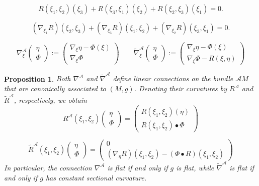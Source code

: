 \documentclass[10pt,a4paper]{amsart}
\newtheorem{prop}{Proposition}
\def\Cal{\mathcal}
\newcommand{\tn}{\widetilde{\nabla}}
\begin{document}
\begin{equation}\label{Bianchi1}
R(\xi_1,\xi_2)(\xi_3)+R(\xi_3,\xi_1)(\xi_2)+R(\xi_2,\xi_3)(\xi_1)=0. 
\end{equation}

\begin{equation}\label{Bianchi2}
(\nabla_{\xi_1}R)(\xi_2,\xi_3)+(\nabla_{\xi_3}R)(\xi_1,\xi_2)+(\nabla_{\xi_2}R)(\xi_3,\xi_1)=0.
\end{equation}

\begin{equation}\label{conn-def}
\nabla^{\Cal A}_\xi\begin{pmatrix} \eta\\ \Phi \end{pmatrix}:=\begin{pmatrix}
\nabla_\xi\eta-\Phi(\xi)\\ \nabla_\xi\Phi \end{pmatrix} \qquad 
\tn^{\Cal A}_\xi\begin{pmatrix} \eta\\ \Phi \end{pmatrix}:=\begin{pmatrix}
\nabla_\xi\eta-\Phi(\xi)\\ \nabla_\xi\Phi-R(\xi,\eta) \end{pmatrix}
\end{equation}

\begin{prop}\label{prop2.2}
Both $\nabla^{\Cal A}$ and $\tn^{\Cal A}$ define linear connections on the bundle
$\Cal AM$ that are canonically associated to $(M,g)$. Denoting their curvatures by
$R^{\Cal A}$ and $\widetilde{R}^{\Cal A}$, respectively, we obtain
$$
R^{\Cal A}(\xi_1,\xi_2)\begin{pmatrix} \eta\\ \Phi \end{pmatrix}=\begin{pmatrix}
R(\xi_1,\xi_2)(\eta) \\ R(\xi_1,\xi_2)\bullet \Phi \end{pmatrix}
$$

$$ \widetilde{R}^{\Cal A}(\xi_1,\xi_2)\begin{pmatrix}
  \eta\\ \Phi \end{pmatrix}=\begin{pmatrix} 0 \\ (\nabla_\eta
R)(\xi_1,\xi_2)-(\Phi\bullet R)(\xi_1,\xi_2)\end{pmatrix}
$$
In particular, the connection $\nabla^{\Cal A}$ is flat if and only if $g$ is flat,
while $\tn^{\Cal A}$ is flat if and only if $g$ has constant sectional curvature.
\end{prop}
\end{document}
